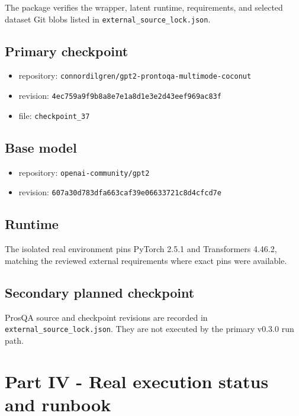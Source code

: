 \documentclass[
  10pt,
]{article}
\providecommand{\tightlist}{%
  \setlength{\itemsep}{0pt}\setlength{\parskip}{0pt}}
\begin{document}
The package verifies the wrapper, latent runtime, requirements, and
selected dataset Git blobs listed in
\texttt{external\_source\_lock.json}.

\subsection{Primary checkpoint}\label{primary-checkpoint}

\begin{itemize}
\tightlist
\item
  repository: \texttt{connordilgren/gpt2-prontoqa-multimode-coconut}
\item
  revision: \texttt{4ec759a9f9b8a8e7e1a8d1e3e2d43eef969ac83f}
\item
  file: \texttt{checkpoint\_37}
\end{itemize}

\subsection{Base model}\label{base-model}

\begin{itemize}
\tightlist
\item
  repository: \texttt{openai-community/gpt2}
\item
  revision: \texttt{607a30d783dfa663caf39e06633721c8d4cfcd7e}
\end{itemize}

\subsection{Runtime}\label{runtime}

The isolated real environment pins PyTorch 2.5.1 and Transformers
4.46.2, matching the reviewed external requirements where exact pins
were available.

\subsection{Secondary planned
checkpoint}\label{secondary-planned-checkpoint}

ProsQA source and checkpoint revisions are recorded in
\texttt{external\_source\_lock.json}. They are not executed by the
primary v0.3.0 run path.

\newpage

\section{Part IV - Real execution status and
runbook}\label{part-iv---real-execution-status-and-runbook}
\end{document}
